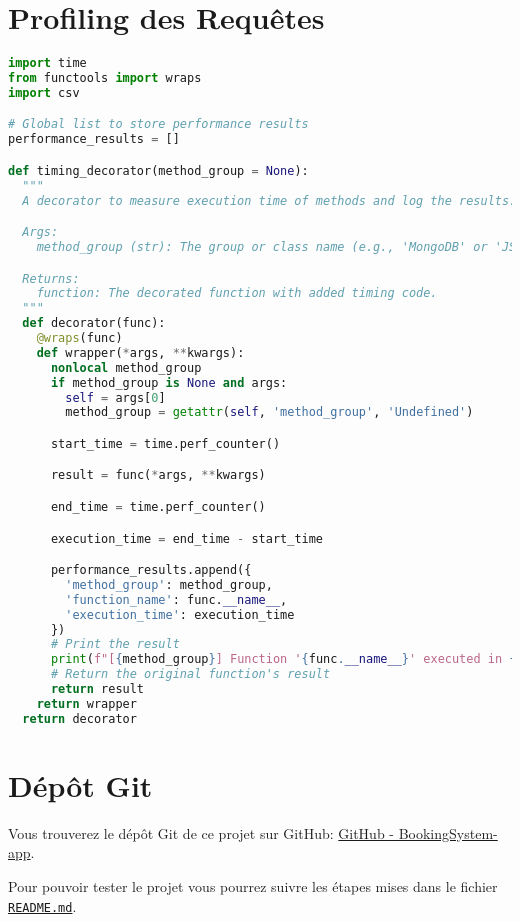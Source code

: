 \section{Profiling des Requêtes}
\label{ann:profiling}
\begin{lstlisting}[language=Python, caption=Profiling des requêtes, label=lst:profiling]
import time
from functools import wraps
import csv

# Global list to store performance results
performance_results = []

def timing_decorator(method_group = None):
  """
  A decorator to measure execution time of methods and log the results.

  Args:
    method_group (str): The group or class name (e.g., 'MongoDB' or 'JSON').

  Returns:
    function: The decorated function with added timing code.
  """
  def decorator(func):
    @wraps(func)
    def wrapper(*args, **kwargs):
      nonlocal method_group
      if method_group is None and args:
        self = args[0]
        method_group = getattr(self, 'method_group', 'Undefined')

      start_time = time.perf_counter()

      result = func(*args, **kwargs)

      end_time = time.perf_counter()

      execution_time = end_time - start_time

      performance_results.append({
        'method_group': method_group,
        'function_name': func.__name__,
        'execution_time': execution_time
      })
      # Print the result
      print(f"[{method_group}] Function '{func.__name__}' executed in {execution_time:.6f} seconds")
      # Return the original function's result
      return result
    return wrapper
  return decorator
\end{lstlisting}

\section{Dépôt Git}
\label{ann:git_repo}
Vous trouverez le dépôt Git de ce projet sur GitHub: \href{https://github.com/sessaadouni/BookingSystem-app}{GitHub - BookingSystem-app}.

Pour pouvoir tester le projet vous pourrez suivre les étapes mises dans le fichier \href{https://github.com/sessaadouni/BookingSystem-app/blob/master/README.md}{\texttt{README.md}}.